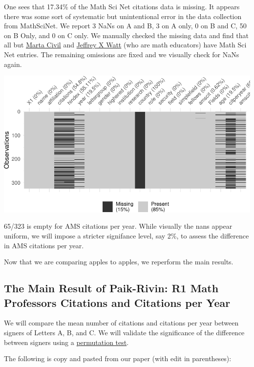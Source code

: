 \documentclass[]{article}
\begin{document}
One sees that 17.34\% of the Math Sci Net citations data is missing. It
appears there was some sort of systematic but unintentional error in the
data collection from MathSciNet. We report 3 NaNs on A and B, 3 on A
only, 0 on B and C, 50 on B Only, and 0 on C only. We manually checked
the missing data and find that all but
\href{https://www.math.arizona.edu/~civil/}{Marta Civil} and
\href{https://science.iupui.edu/people/watt-jeffrey}{Jeffrey X Watt}
(who are math educators) have Math Sci Net entries. The remaining
omissions are fixed and we visually check for NaNs again.

\includegraphics{index_files/figure-latex/unnamed-chunk-6-1.pdf}

65/323 is empty for AMS citations per year. While visually the nans
appear uniform, we will impose a stricter signifance level, say 2\%, to
assess the difference in AMS citations per year.

Now that we are comparing apples to apples, we reperform the main
results.

\hypertarget{the-main-result-of-paik-rivin-r1-math-professors-citations-and-citations-per-year}{%
\subsection{The Main Result of Paik-Rivin: R1 Math Professors Citations
and Citations per
Year}\label{the-main-result-of-paik-rivin-r1-math-professors-citations-and-citations-per-year}}

We will compare the mean number of citations and citations per year
between signers of Letters A, B, and C. We will validate the
significance of the difference between signers using a
\href{https://en.wikipedia.org/wiki/Resampling_(statistics)\#Permutation_tests}{permutation
test}.

The following is copy and pasted from our paper (with edit in
parentheses):
\end{document}
